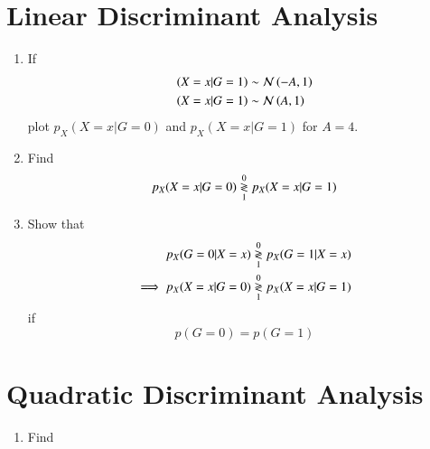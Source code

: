 \documentclass[journal,12pt,twocolumn]{IEEEtran}
\renewcommand\thesection{\arabic{section}}
\begin{document}
\section{Linear Discriminant Analysis}
\begin{enumerate}[label=\thesection.\arabic*
,ref=\thesection.\theenumi]

%
%
%
\item If
\begin{align}
\left(X=x|G=1\right) &\sim \mathcal{N}\left(-A,1\right)
\\
\left(X=x|G=1\right) &\sim \mathcal{N}\left(A,1\right)
\end{align}
plot $p_{X}(X=x|G=0)$ and   $p_{X}(X=x|G=1)$ for $A = 4$.
\item Find
\begin{equation}
p_{X}(X=x|G=0) \overset{0}{\underset{1}{\gtrless}} p_{X}(X=x|G=1)
\end{equation}

\item Show that 
\begin{align}
p_{X}(G=0|X=x) &\overset{0}{\underset{1}{\gtrless}} p_{X}(G=1|X=x) 
\\
\implies p_{X}(X=x|G=0) &\overset{0}{\underset{1}{\gtrless}} p_{X}(X=x|G=1)
\end{align}
if
\begin{equation}
p(G=0)=p(G=1)
\end{equation}

\end{enumerate}


\section{Quadratic Discriminant Analysis}
\begin{enumerate}[label=\thesection.\arabic*
,ref=\thesection.\theenumi]
\item Find

\end{enumerate}
%
\end{document}

